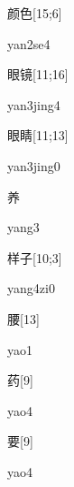 \begin{verbete}[yan2se4]{颜色}[15;6]
\begin{pronuncia}{yan2se4}
\end{pronuncia}
\end{verbete}

\begin{verbete}{眼镜}[11;16]
\begin{pronuncia}{yan3jing4}
\end{pronuncia}
\end{verbete}

\begin{verbete}{眼睛}[11;13]
\begin{pronuncia}{yan3jing0}
\end{pronuncia}
\end{verbete}

\begin{verbete}[yang3]{养}
\begin{pronuncia}{yang3}
\end{pronuncia}
\end{verbete}

\begin{verbete}[yang4zi0]{样子}[10;3]
\begin{pronuncia}{yang4zi0}
\end{pronuncia}
\end{verbete}

\begin{verbete}[yao1]{腰}[13]
\begin{pronuncia}{yao1}
\end{pronuncia}
\end{verbete}

\begin{verbete}[yao4]{药}[9]
\begin{pronuncia}{yao4}
\end{pronuncia}
\end{verbete}

\begin{verbete}[yao4]{要}[9]
\begin{pronuncia}{yao4}
\end{pronuncia}
\end{verbete}

